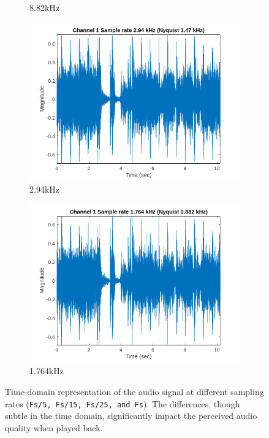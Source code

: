 \documentclass[12pt]{article}
\newcommand{\code}[1]{\colorbox{gray!20}{\texttt{#1}}}
\begin{document}
\begin{figure}[htbp]
\begin{subfigure}[b]{0.48\textwidth}
    \caption{8.82kHz}
    \label{fig:f1}
  \end{subfigure}
  \hfill
  \begin{subfigure}[b]{0.48\textwidth} %
    \includegraphics[width=\linewidth]{labs/lab1/lab-report-tex/figures/figure_3.png}
    \caption{2.94kHz}
    \label{fig:f2}
  \end{subfigure}
  \begin{subfigure}[b]{0.48\textwidth} %
    \includegraphics[width=\linewidth]{labs/lab1/lab-report-tex/figures/figure_4.png}
    \caption{1.764kHz}
    \label{fig:f2}
  \end{subfigure}
  \caption{Time-domain representation of the audio signal at different sampling rates (\code{Fs/5, Fs/15, Fs/25, and Fs}). The differences, though subtle in the time domain, significantly impact the perceived audio quality when played back.}
\end{figure}
\FloatBarrier
\end{document}
